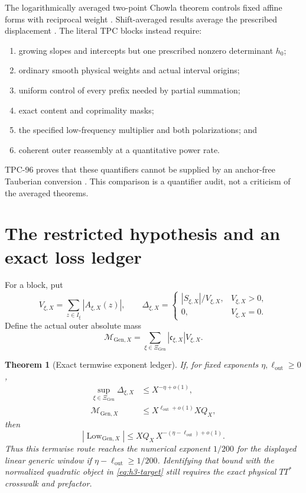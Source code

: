 \documentclass[11pt]{article}
\newtheorem{theorem}{Theorem}[section]
\theoremstyle{definition}
\theoremstyle{remark}
\begin{document}
The logarithmically averaged two-point Chowla theorem controls fixed
affine forms with reciprocal weight
\citep{Tao2016LogChowla}.  Shift-averaged results average the
prescribed displacement \citep{MatomakiRadziwillTao2015}.  The
literal TPC blocks instead require:
\begin{enumerate}[label=(\roman*),leftmargin=2.2em]
\item growing slopes and intercepts but one prescribed nonzero
determinant \(h_0\);
\item ordinary smooth physical weights and actual interval origins;
\item uniform control of every prefix needed by partial summation;
\item exact content and coprimality masks;
\item the specified low-frequency multiplier and both
polarizations; and
\item coherent outer reassembly at a quantitative power rate.
\end{enumerate}
TPC-96 proves that these quantifiers cannot be supplied by an
anchor-free Tauberian conversion \citep{WangTPC96}.  This comparison
is a quantifier audit, not a criticism of the averaged theorems.

\section{The restricted hypothesis and an exact loss ledger}

For a block, put
\[
 V_{\xi,X}=\sum_{z\in I_\xi}|A_{\xi,X}(z)|,
\qquad
 \Delta_{\xi,X}
 =
 \begin{cases}
 |S_{\xi,X}|/V_{\xi,X},&V_{\xi,X}>0,\\
 0,&V_{\xi,X}=0.
 \end{cases}
\]
Define the actual outer absolute mass
\begin{equation}
 \mathcal M_{\mathrm{Gen},X}
 =
 \sum_{\xi\in\Xi_{\mathrm{Gen}}}
 |\mathfrak c_{\xi,X}|V_{\xi,X}.
\label{eq:outer-mass}
\end{equation}

\begin{theorem}[Exact termwise exponent ledger]
\label{thm:outer-ledger}
If, for fixed exponents \(\eta,\ell_{\mathrm{out}}\ge0\),
\begin{align}
 \sup_{\xi\in\Xi_{\mathrm{Gen}}}\Delta_{\xi,X}
 &\le X^{-\eta+o(1)},
\label{eq:block-saving}\\
 \mathcal M_{\mathrm{Gen},X}
 &\le X^{\ell_{\mathrm{out}}+o(1)}XQ_X,
\label{eq:outer-loss}
\end{align}
then
\begin{equation}
 |\operatorname{Low}_{\mathrm{Gen},X}|
 \le XQ_X\,X^{-(\eta-\ell_{\mathrm{out}})+o(1)}.
\label{eq:net-saving}
\end{equation}
Thus this termwise route reaches the numerical exponent \(1/200\)
for the displayed linear generic window if
\(\eta-\ell_{\mathrm{out}}\ge1/200\).  Identifying that bound with the
normalized quadratic object in \eqref{eq:h3-target} still requires
the exact physical \(TT^*\) crosswalk and prefactor.
\end{theorem}
\end{document}
